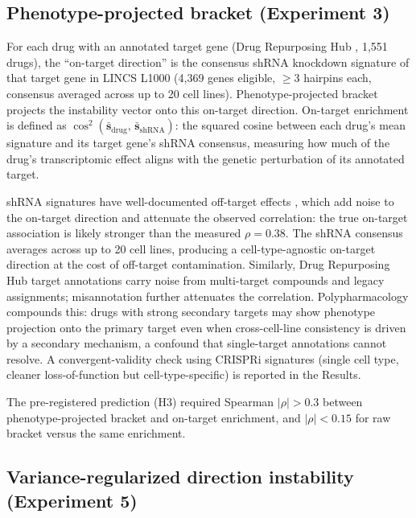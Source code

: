 \documentclass[11pt]{article}
\begin{document}
\subsection{Phenotype-projected bracket (Experiment 3)}

For each drug with an annotated target gene (Drug Repurposing Hub
\citep{corsello2017drug}, 1{,}551 drugs), the ``on-target direction'' is the consensus shRNA
knockdown signature of that target gene in LINCS L1000 (4{,}369 genes
eligible, $\geq$3 hairpins each, consensus averaged across up to 20 cell lines).
Phenotype-projected bracket projects the instability vector onto this
on-target direction. On-target enrichment is defined as $\cos^2(\bar{\mathbf{s}}_{\text{drug}},\,
\bar{\mathbf{s}}_{\text{shRNA}})$: the squared cosine between each drug's
mean signature and its target gene's shRNA consensus, measuring how much
of the drug's transcriptomic effect aligns with the genetic perturbation of
its annotated target.

shRNA signatures have well-documented off-target effects
\citep{smith2017evaluation}, which add noise to the on-target direction
and attenuate the observed correlation: the true on-target association is
likely stronger than the measured $\rho = 0.38$.
The shRNA consensus averages across up to 20 cell lines, producing a
cell-type-agnostic on-target direction at the cost of off-target
contamination. Similarly, Drug Repurposing Hub target annotations carry
noise from multi-target compounds and legacy assignments; misannotation
further attenuates the correlation. Polypharmacology compounds this:
drugs with strong secondary targets may show phenotype projection onto the
primary target even when cross-cell-line consistency is driven by a
secondary mechanism, a confound that single-target annotations cannot
resolve. A convergent-validity
check using CRISPRi signatures (single cell type, cleaner
loss-of-function but cell-type-specific) is reported in the Results.

The pre-registered prediction (H3) required Spearman $|\rho| > 0.3$ between
phenotype-projected bracket and on-target enrichment, and $|\rho| < 0.15$
for raw bracket versus the same enrichment.

\subsection{Variance-regularized direction instability (Experiment 5)}
\end{document}
